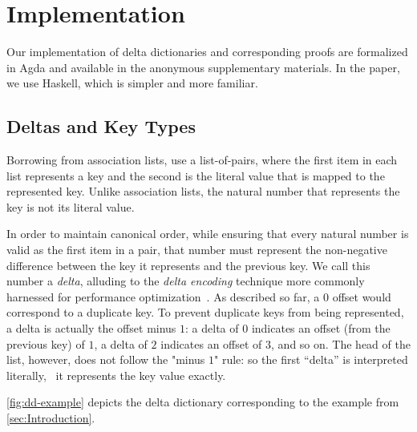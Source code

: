 \section{Implementation}
\label{sec:DD}



Our implementation of delta dictionaries and corresponding proofs are formalized in Agda and available in the anonymous supplementary materials.
%
In the paper, we use Haskell, which is simpler and more familiar.

\subsection{Deltas and Key Types}

Borrowing from association lists, \dds{} use a list-of-pairs, where the first item in each list represents a key and the second is the literal value that is mapped to the represented key.
%
Unlike association lists, the natural number that represents the key is not its literal value.

In order to maintain canonical order, while ensuring that every natural number is valid as the first item in a pair, that number must represent the non-negative difference between the key it represents and the previous key.
%
We call this number a \emph{delta}, alluding to the \emph{delta encoding} technique more commonly harnessed for performance optimization~\citep{XXX}.
%
As described so far, a $0$ offset would correspond to a duplicate key.
%
To prevent duplicate keys from being represented, a delta is actually the offset minus $1$: a delta of $0$ indicates an offset (from the previous key) of $1$, a delta of $2$ indicates an offset of $3$, and so on.
%
The head of the list, however, does not follow the "minus $1$" rule: so the first ``delta'' is interpreted literally, \ie{}~it represents the key value exactly.

\autoref{fig:dd-example} depicts the delta dictionary corresponding to the example from \autoref{sec:Introduction}.

